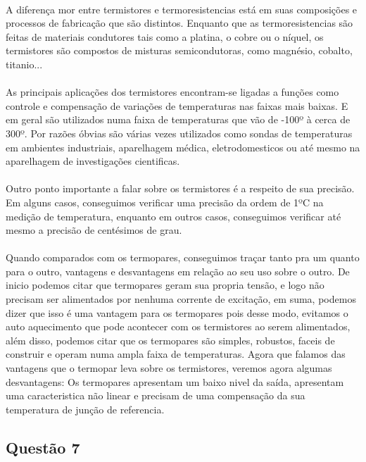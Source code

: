 \documentclass[a4paper,11pt]{article}
\begin{document}
	\paragraph{}A diferença mor entre termistores e termoresistencias está em suas composições e processos de fabricação que são distintos. Enquanto que as termoresistencias são feitas de materiais condutores tais como a platina, o cobre ou o níquel, os termistores são compostos de misturas semicondutoras, como magnésio, cobalto, titanio...
	\paragraph{}As principais aplicações dos termistores encontram-se ligadas a funções como controle e compensação de variações de temperaturas nas faixas mais baixas. E em geral são utilizados numa faixa de temperaturas que vão de -100º à cerca de 300º. Por razões óbvias são várias vezes utilizados como sondas de temperaturas em ambientes industriais, aparelhagem médica, eletrodomesticos ou até mesmo na aparelhagem de investigações cientificas.
	\paragraph{}Outro ponto importante a falar sobre os termistores é a respeito de sua precisão. Em alguns casos, conseguimos verificar uma precisão da ordem de 1ºC na medição de temperatura, enquanto em outros casos, conseguimos verificar até mesmo a precisão de centésimos de grau.
	\paragraph{}Quando comparados com os termopares, conseguimos traçar tanto pra um quanto para o outro, vantagens e desvantagens em relação ao seu uso sobre o outro. De inicio podemos citar que termopares geram sua propria tensão, e logo não precisam ser alimentados por nenhuma corrente de excitação, em suma, podemos dizer que isso é uma vantagem para os termopares pois desse modo, evitamos o auto aquecimento que pode acontecer com os termistores ao serem alimentados, além disso, podemos citar que os termopares são simples, robustos, faceis de construir e operam numa ampla faixa de temperaturas. Agora que falamos das vantagens que o termopar leva sobre os termistores, veremos agora algumas desvantagens: Os termopares apresentam um baixo nivel da saída, apresentam uma caracteristica não linear e precisam de uma compensação da sua temperatura de junção de referencia.
\subsection{Questão 7}
\end{document}
